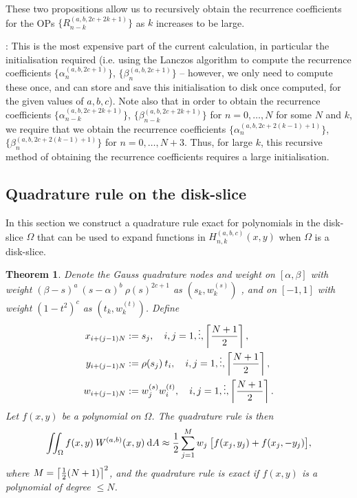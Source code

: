 \documentclass[11pt, oneside]{article}   	%
\newcommand{\bstodo}{\todo[color=pink]}
\newcommand{\half}{\frac{1}{2}}
\newcommand{\hdop}{H}
\newcommand{\Wab}{{W^{(a,b)}}}
\newcommand{\genjac}{R}
\newcommand{\hdopnkabc}{\hdop_{n,k}^{(a,b,c)}}
\newtheorem{theorem}{Theorem}
\begin{document}
These two propositions allow us to recursively obtain the recurrence coefficients for the OPs $\{\genjac_{n-k}^{(a,b,2c+2k + 1)}\}$ as $k$ increases to be large. 

:  \bstodo{improve this remark}
This is the most expensive part of the current calculation, in particular the initialisation required (i.e. using the Lanczos algorithm to compute the recurrence coefficients $\{\alpha_{n}^{(a,b,2c+1)}\}$, $\{\beta_{n}^{(a,b,2c+1)}\}$ -- however, we only need to compute these once, and can store and save this initialisation to disk once computed, for the given values of $a, b, c$). Note also that in order to obtain the recurrence coefficients $\{\alpha_{n-k}^{(a,b,2c+2k+1)}\}$, $\{\beta_{n-k}^{(a,b,2c+2k+1)}\}$ for $n = 0,\dots,N$ for some $N$ and $k$, we require that we obtain the recurrence coefficients $\{\alpha_{n}^{(a,b,2c+2(k-1)+1)}\}$, $\{\beta_{n}^{(a,b,2c+2(k-1)+1)}\}$ for $n = 0,\dots,N+3$. Thus, for large $k$, this recursive method of obtaining the recurrence coefficients requires a large initialisation.

\subsection{Quadrature rule on the disk-slice}

In this section we construct a quadrature rule exact for polynomials in the disk-slice $\Omega$ that can be used to expand functions in $\hdopnkabc(x,y)$ when $\Omega$ is a disk-slice.

\begin{theorem}
Denote the  Gauss quadrature nodes and weight on $[\alpha,\beta]$ with weight $(\beta - s)^a \: (s - \alpha)^b \: \rho(s)^{2c+1}$ as $(s_k,w_k^{(s)})$ , and
 on \([-1,1]\) with weight \((1-t^2)^c\) as $(t_k,w_k^{(t)})$. Define
\begin{align*}
	x_{i+(j-1)N} &:= s_j, \quad i,j = 1,\vdots, \left\lceil\frac{N+1}{2}\right\rceil, \\
	y_{i+(j-1)N} &:= \rho(s_j) \: t_i, \quad i,j = 1,\vdots, \left\lceil\frac{N+1}{2}\right\rceil, \\
	w_{i+(j-1)N} &:= w_j^{(s)} w_i^{(t)}, \quad  i,j = 1,\vdots, \left\lceil\frac{N+1}{2}\right\rceil.
\end{align*}
Let $f(x,y)$ be a polynomial on $\Omega$. The quadrature rule is then
$$
\iint_\Omega f(x,y) \: \Wab(x,y) \: \D A \approx \half \sum_{j=1}^{M} w_j \: \big[ f(x_j, y_j) + f(x_j, -y_j) \big],
$$
where $M = \ceil{\half(N+1)}^2$, and the quadrature rule is exact if $f(x,y)$ is a polynomial of degree $\le N$.
\end{theorem}
\end{document}
